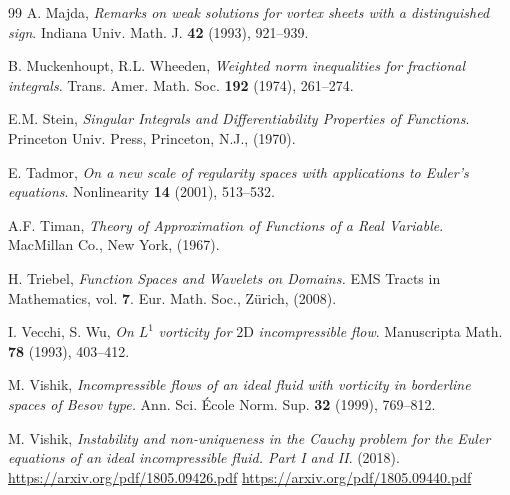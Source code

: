 \documentclass[11pt, a4paper,leqno]{amsart}
\theoremstyle{plain}
\numberwithin{equation}{section}
\theoremstyle{definition}
\theoremstyle{remark}
\begin{document}
\begin{thebibliography}{99}
A. Majda, \emph{Remarks on weak solutions for vortex sheets with
a distinguished sign}. Indiana Univ. Math. J. \textbf{42 }(1993), 921--939.


%

B. Muckenhoupt, R.L. Wheeden, \emph{Weighted norm inequalities
for fractional integrals}. Trans. Amer. Math. Soc. \textbf{192 }(1974), 261--274.




 E.M. Stein, \emph{Singular Integrals and Differentiability Properties of Functions}. Princeton Univ. Press, Princeton, N.J., (1970). 

E. Tadmor, \emph{On a new scale of regularity spaces with
applications to Euler's equations}. Nonlinearity \textbf{14 }(2001), 513--532.

 A.F. Timan, \emph{Theory of Approximation of Functions of a Real Variable}. MacMillan Co., New York, (1967).

 H. Triebel, \emph{Function Spaces and Wavelets on Domains.} EMS Tracts in Mathematics, vol. \textbf{7}.  Eur. Math. Soc., Z\"urich, (2008).

I. Vecchi, S. Wu, \emph{On }$L^{1}$\emph{ vorticity for
}$2$D\emph{ incompressible flow}. Manuscripta Math. \textbf{78} (1993), 403--412.

M. Vishik, \emph{Incompressible flows of an ideal fluid with
vorticity in borderline spaces of Besov type.} Ann. Sci. \'{E}cole Norm. Sup.
\textbf{32} (1999), 769--812.

M. Vishik, \emph{Instability and non-uniqueness in the Cauchy
problem for the Euler equations of an ideal incompressible fluid. Part I and II}.
(2018). \url{https://arxiv.org/pdf/1805.09426.pdf} \url{https://arxiv.org/pdf/1805.09440.pdf}


\end{thebibliography}
\end{document}
